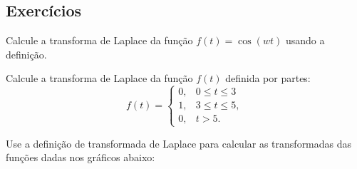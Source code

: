 \subsection*{Exercícios}
\begin{exer}Calcule a transforma de Laplace da função $f(t)=\cos(wt)$ usando a definição. 
\end{exer}
\begin{exer}Calcule a transforma de Laplace da função $f(t)$ definida por partes:
$$
f(t)=\left\{\begin{array}{ll} 0, &0\leq t\leq 3\\ 1, & 3\leq t\leq 5,\\0,&t>5.
\end{array}\right.
$$
\end{exer}
\begin{exer}{\label{ex_cap_3_1}} Use a definição de transformada de Laplace para calcular as transformadas das funções dadas nos gráficos abaixo:
\begin{center}


\end{center}
\end{exer}
